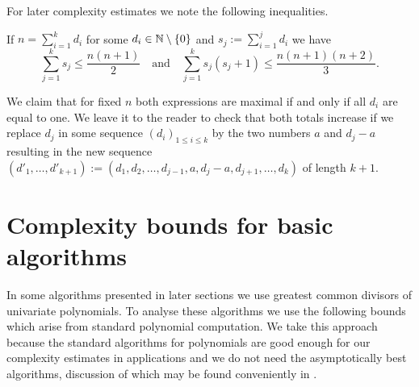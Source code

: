 For later complexity estimates we note the following inequalities.

\begin{Lemm}
\label{estimates}
If $n = \sum_{i=1}^k d_i$ for some $d_i \in \mathbb{N} \setminus\{0\}$ and
$s_j := \sum_{i=1}^j d_i$ we have
\[ \sum_{j=1}^k s_j \le \frac{n(n+1)}{2} \quad \mbox{and} \quad
   \sum_{j=1}^k s_j(s_j+1) 
   \le \frac{n(n+1)(n+2)}{3}. \]
\end{Lemm}
\proofbeg
We claim that for fixed $n$ both expressions are maximal if and only if
all $d_i$ are equal to one. We leave it to the reader to check that
both totals increase if we replace $d_j$ in some sequence
$(d_i)_{1 \le i \le k}$ by the two numbers $a$ and $d_j-a$ resulting
in the new sequence $(d'_1, \ldots, d'_{k+1}) := 
(d_1, d_2, \ldots, d_{j-1}, a, d_j-a, d_{j+1}, \ldots, d_k)$ 
of length $k+1$.
%
\proofend

\section{Complexity bounds for basic algorithms}
\label{complexity}

In some algorithms presented in later sections we use greatest common divisors
of univariate polynomials. To analyse these algorithms we use the 
following bounds which arise from standard polynomial computation. 
We take this approach because the standard algorithms for polynomials
are good enough for our complexity estimates in applications and we do not 
need the asymptotically best algorithms, discussion of which may be found 
conveniently in \cite{vzG}. 

